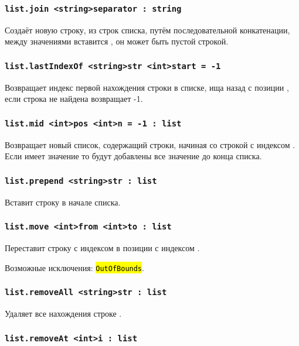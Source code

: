 \documentclass[a4paper, 14pt]{extarticle}
\newcommand{\ferror}[1]{{\fontsize{11pt}{12pt}\tt{\sethlcolor{yellow}\hl{#1}}}}
\begin{document}
\subsubsection{\lstinline|list.join <string>separator : string|}

Создаёт новую строку, из строк списка, путём последовательной конкатенации, между значениями вставится , он может быть пустой строкой.

\subsubsection{\lstinline|list.lastIndexOf <string>str <int>start = -1|}

Возвращает индекс первой нахождения строки  в списке, ища назад с позиции , если строка не найдена возвращает -1.

\subsubsection{\lstinline|list.mid <int>pos <int>n = -1 : list|}

Возвращает новый список, содержащий  строки, начиная со строкой с индексом . Если  имеет значение  то будут добавлены все значение до конца списка.

\subsubsection{\lstinline|list.prepend <string>str : list|}

Вставит строку  в начале списка.

\subsubsection{\lstinline|list.move <int>from <int>to : list|}

Переставит строку с индексом  в позиции с индексом .

Возможные исключения: \ferror{OutOfBounds}.

\subsubsection{\lstinline|list.removeAll <string>str : list|}

Удаляет все нахождения строке .

\subsubsection{\lstinline|list.removeAt <int>i : list|}
\end{document}
